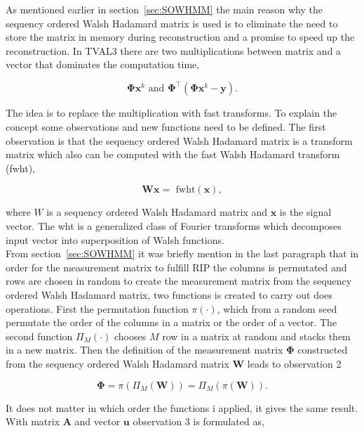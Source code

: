 As mentioned earlier in section~\ref{sec:SOWHMM} the main reason why the sequency ordered Walsh Hadamard matrix is used is to eliminate the need to store the matrix in memory during reconstruction and a promise to speed up the reconstruction. In TVAL3 there are two multiplications between matrix and a vector that dominates the computation time,

\begin{equation}
\mathbf{\Phi}\mathbf{x}^k \text{ and } \mathbf{\Phi}^\top(\mathbf{\Phi}\mathbf{x}^k-\mathbf{y})\text{.}
\end{equation}

The idea is to replace the multiplication with fast transforms. To explain the concept some observations and new functions need to be defined. The first observation is that the sequency ordered Walsh Hadamard matrix is a transform matrix which also can be computed with the fast Walsh Hadamard transform (fwht),

\begin{equation}
\mathbf{W}\mathbf{x} = \text{ fwht}(\mathbf{x}),
\end{equation}

where $W$ is a sequency ordered Walsh Hadamard matrix and $\mathbf{x}$ is the signal vector. The wht is a generalized class of Fourier transforms which decomposes input vector into superposition of Walsh functions.\\[0.1in]

From section~\ref{sec:SOWHMM} it was briefly mention in the last paragraph that in order for the measurement matrix to fulfill RIP the columns is permutated and rows are chosen in random to create the measurement matrix from the sequency ordered Walsh Hadamard matrix, two functions is created to carry out does operations. First the permutation function $\pi(\cdot)$, which from a random seed permutate the order of the columns in a matrix or the order of a vector. The second function $\Pi_M(\cdot)$ chooses $M$ row in a matrix at random and stacks them in a new matrix. Then the definition of the measurement matrix $\mathbf{\Phi}$ constructed from the sequency ordered Walsh Hadamard matrix $\mathbf{W}$ leads to observation 2

\begin{equation}
\mathbf{\Phi} = \pi(\Pi_M(\mathbf{W})) = \Pi_M(\pi(\mathbf{W}))\text{.}
\end{equation}

It does not matter in which order the functions i applied, it gives the same result. With matrix $\mathbf{A}$ and vector $\mathbf{u}$ observation 3 is formulated as,

